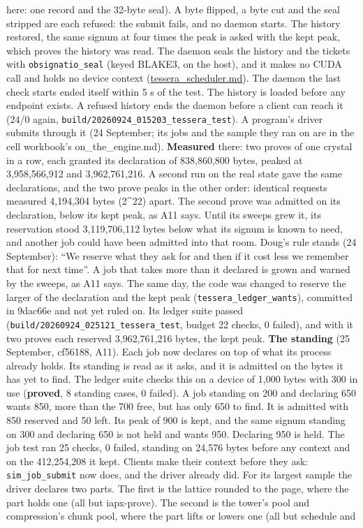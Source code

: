\begin{description}
here: one record and the 32-byte seal). A byte flipped, a byte cut and the seal stripped are each refused: the submit fails, and no daemon starts. The history restored, the same signum at four times the peak is asked with the kept peak, which proves the history was read. The daemon seals the history and the tickets with \texttt{obsignatio\_\allowbreak{}seal} (keyed BLAKE3, on the host), and it makes no CUDA call and holds no device context (\hyperref[chap:tessera-scheduler]{tessera\_\allowbreak{}scheduler.md}). The daemon the last check starts ended itself within 5 s of the test. The history is loaded before any endpoint exists. A refused history ends the daemon before a client can reach it (24/0 again, \texttt{build/\allowbreak{}20260924\_\allowbreak{}015203\_\allowbreak{}tessera\_\allowbreak{}test}). A program's driver submits through it (24 September; its jobs and the sample they ran on are in the cell workbook's on\_\allowbreak{}the\_\allowbreak{}engine.md). \textbf{Measured} there: two proves of one crystal in a row, each granted its declaration of 838,860,800 bytes, peaked at 3,958,566,912 and 3,962,761,216. A second run on the real state gave the same declarations, and the two prove peaks in the other order: identical requests measured 4,194,304 bytes (2\textasciicircum{}22) apart. The second prove was admitted on its declaration, below its kept peak, as A11 says. Until its sweeps grew it, its reservation stood 3,119,706,112 bytes below what its signum is known to need, and another job could have been admitted into that room. Doug's rule stands (24 September): “We reserve what they ask for and then if it cost less we remember that for next time”. A job that takes more than it declared is grown and warned by the sweeps, as A11 says. The same day, the code was changed to reserve the larger of the declaration and the kept peak (\texttt{tessera\_\allowbreak{}ledger\_\allowbreak{}wants}), committed in 9dac66e and not yet ruled on. Its ledger suite passed (\texttt{build/\allowbreak{}20260924\_\allowbreak{}025121\_\allowbreak{}tessera\_\allowbreak{}test}, budget 22 checks, 0 failed), and with it two proves each reserved 3,962,761,216 bytes, the kept peak. \textbf{The standing} (25 September, cf56188, A11). Each job now declares on top of what its process already holds. Its standing is read as it asks, and it is admitted on the bytes it has yet to find. The ledger suite checks this on a device of 1,000 bytes with 300 in use (\textbf{proved}, 8 standing cases, 0 failed). A job standing on 200 and declaring 650 wants 850, more than the 700 free, but has only 650 to find. It is admitted with 850 reserved and 50 left. Its peak of 900 is kept, and the same signum standing on 300 and declaring 650 is not held and wants 950. Declaring 950 is held. The job test ran 25 checks, 0 failed, standing on 24,576 bytes before any context and on the 412,254,208 it kept. Clients make their context before they ask: \texttt{sim\_\allowbreak{}job\_\allowbreak{}submit} now does, and the driver already did. For its largest sample the driver declares two parts. The first is the lattice rounded to the page, where the part holds one (all but iapx-prove). The second is the tower's pool and compression's chunk pool, where the part lifts or lowers one (all but schedule and 
\end{description}
